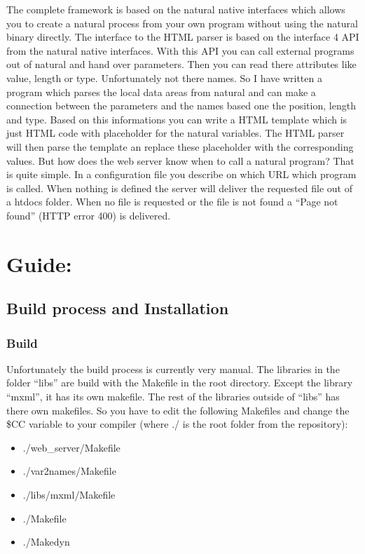 \documentclass[letterpaper,10pt,english]{sphinxmanual}
\begin{document}
The complete framework is based on the natural native interfaces which allows you to create a natural process from your own program without using the natural binary directly. The interface to the HTML parser is based on the interface 4 API from the natural native interfaces. With this API you can call external programs out of natural and hand over parameters. Then you can read there attributes like value, length or type. Unfortunately not there names. So I have written a program which parses the local data areas from natural and can make a connection between the parameters and the names based one the position, length and type. Based on this informations you can write a HTML template which is just HTML code with placeholder for the natural variables. The HTML parser will then parse the template an replace these placeholder with the corresponding values. But how does the web server know when to call a natural program? That is quite simple. In a configuration file you describe on which URL which program is called. When nothing is defined the server will deliver the requested file out of a htdocs folder. When no file is requested or the file is not found a ``Page not found'' (HTTP error 400) is delivered.


\chapter{Guide:}
\label{index:guide}

\section{Build process and Installation}
\label{installation::doc}\label{installation:build-process-and-installation}

\subsection{Build}
\label{installation:build}
Unfortunately the build process is currently very manual.
The libraries in the folder ``libs'' are build with the Makefile in the root directory. Except the library ``mxml'', it has its own makefile.
The rest of the libraries outside of ``libs'' has there own makefiles.
So you have to edit the following Makefiles and change the \$CC variable to your compiler (where ./ is the root folder from the repository):
\begin{itemize}
\item {} 
./web\_server/Makefile

\item {} 
./var2names/Makefile

\item {} 
./libs/mxml/Makefile

\item {} 
./Makefile

\item {} 
./Makedyn

\end{itemize}
\end{document}
